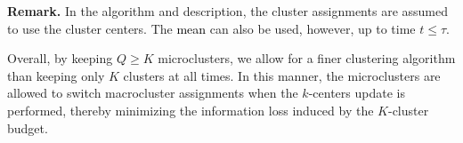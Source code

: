 \documentclass[12pt]{article}
\renewcommand{\paragraph}[1]{\textbf{#1.}\;}
\newcommand{\ie}{{\it i.e.}}
\newcommand{\prob}{{\mathbf P}}
\newcommand{\RC}[1]{\textcolor{black}{#1}}
\newcommand{\RC}[1]{\textcolor{blue}{#1}}
\begin{document}
\paragraph{Remark}
In the algorithm and description, the cluster assignments are assumed to use the cluster centers. The \RC{mean} can also be used, however, up to time $t\leq \tau$.  

Overall, by keeping $Q\geq K$ microclusters, we allow for a finer clustering algorithm than keeping only $K$ clusters at all times. In this manner, the microclusters are allowed to switch macrocluster assignments when the $k$-centers update is performed, thereby minimizing the information loss induced by the $K$-cluster budget.




\end{document}
